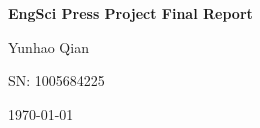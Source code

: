 \documentclass[../main.tex]{subfiles}
\begin{document}
\centering

\vspace*{1.5in}

\begin{Huge}
	\textbf{EngSci Press Project Final Report}
\end{Huge}

\vspace{1in}

\begin{Large}
	Yunhao Qian
\end{Large}

\vspace{0.3in}

\begin{Large}
	SN: 1005684225
\end{Large}

\vspace{\fill}

\begin{Large}
	\today
\end{Large}

\vspace*{1.5in}
\end{document}
